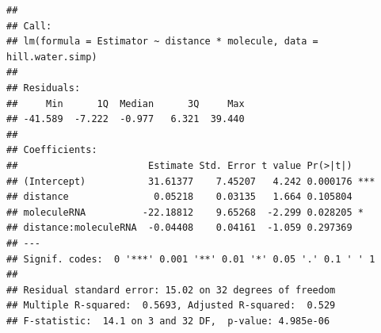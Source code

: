 \documentclass[]{article}
\newenvironment{Shaded}{\begin{snugshade}}{\end{snugshade}}
\newcommand{\KeywordTok}[1]{\textcolor[rgb]{0.13,0.29,0.53}{\textbf{#1}}}
\newcommand{\DataTypeTok}[1]{\textcolor[rgb]{0.13,0.29,0.53}{#1}}
\newcommand{\DecValTok}[1]{\textcolor[rgb]{0.00,0.00,0.81}{#1}}
\newcommand{\StringTok}[1]{\textcolor[rgb]{0.31,0.60,0.02}{#1}}
\newcommand{\CommentTok}[1]{\textcolor[rgb]{0.56,0.35,0.01}{\textit{#1}}}
\newcommand{\OperatorTok}[1]{\textcolor[rgb]{0.81,0.36,0.00}{\textbf{#1}}}
\newcommand{\NormalTok}[1]{#1}
\begin{document}
\begin{verbatim}
## 
## Call:
## lm(formula = Estimator ~ distance * molecule, data = hill.water.simp)
## 
## Residuals:
##     Min      1Q  Median      3Q     Max 
## -41.589  -7.222  -0.977   6.321  39.440 
## 
## Coefficients:
##                       Estimate Std. Error t value Pr(>|t|)    
## (Intercept)           31.61377    7.45207   4.242 0.000176 ***
## distance               0.05218    0.03135   1.664 0.105804    
## moleculeRNA          -22.18812    9.65268  -2.299 0.028205 *  
## distance:moleculeRNA  -0.04408    0.04161  -1.059 0.297369    
## ---
## Signif. codes:  0 '***' 0.001 '**' 0.01 '*' 0.05 '.' 0.1 ' ' 1
## 
## Residual standard error: 15.02 on 32 degrees of freedom
## Multiple R-squared:  0.5693, Adjusted R-squared:  0.529 
## F-statistic:  14.1 on 3 and 32 DF,  p-value: 4.985e-06
\end{verbatim}

\begin{Shaded}
\end{Shaded}
\end{document}
